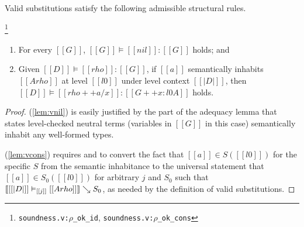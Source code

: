 \documentclass[acmsmall, screen=true, nonacm=true,
  review=\ifpublic false\else true\fi,
  anonymous=\ifanonymous true\else false\fi
]{acmart}
\DeclarePairedDelimiter{\bracks}{\llbracket}{\rrbracket}
\newcommand{\suppl}[3]{{\scriptsize\texttt{#2:#3}}}
\newcommand{\interp}[4]{\bracks{#1 \vDash_{#2} #3} \searrow #4}
\newcommand{\member}[3]{#1 \in #3(#2)}
\newcommand{\sws}[3]{#1 \vDash #2 : #3}
\newlength{\punctwidth}
\newcommand{\stack}[1]{%
  \settowidth{\punctwidth}{#1}%
  \hspace*{-\the\punctwidth}%
}
\begin{document}
Valid substitutions satisfy the following admissible structural rules.

\begin{lemma}
  \stack{.~}\footnote{\suppl{theories}{soundness.v}{$\rho$\_ok\_id}, \suppl{theories}{soundness.v}{$\rho$\_ok\_cons}}
  \label{lem:vsubst}
  \leavevmode
  \begin{enumerate}
    \item \label{lem:vnil} For every $[[G]]$, $\sws{[[G]]}{[[nil]]}{[[G]]}$ holds; and
    \item \label{lem:vcons} Given $\sws{[[D]]}{[[rho]]}{[[G]]}$,
      if $[[a]]$ semantically inhabits $[[A { rho }]]$
      at level $[[l0]]$ under level context $[[| D |]]$,
      then $\sws{[[D]]}{[[rho ++ {a / x} ]]}{[[G ++ x : l0 A ]]}$ holds.
  \end{enumerate}
\end{lemma}

\begin{proof}
  (\ref{lem:vnil}) is easily justified by the part of the adequacy lemma
  that states level-checked neutral terms (variables in $[[G]]$ in
  this case) semantically inhabit any well-formed types.

  (\ref{lem:vcons}) requires  and
   to convert the fact that
  $\member{[[a]]}{[[l0]]}{S}$ for the specific $S$ from the
  semantic inhabitance to the universal statement that
  $\member{[[a]]}{[[l0]]}{S_0}$ for arbitrary $j$ and $S_0$ such that
  $\interp{[[|D|]]}{[[j]]}{[[A { rho }]]}{S_0}$, as needed by the
  definition of valid substitutions.
\end{proof}

\end{document}
